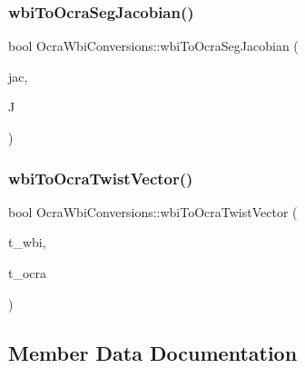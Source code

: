 \subsubsection{\texorpdfstring{wbi\+To\+Ocra\+Seg\+Jacobian()}{wbiToOcraSegJacobian()}}
{\footnotesize\ttfamily bool Ocra\+Wbi\+Conversions\+::wbi\+To\+Ocra\+Seg\+Jacobian (\begin{DoxyParamCaption}\item[{const Eigen\+::\+Matrix\+Xd \&}]{jac,  }\item[{Eigen\+::\+Matrix\+Xd \&}]{J }\end{DoxyParamCaption})\hspace{0.3cm}{\ttfamily [static]}}

\hypertarget{classocra__icub_1_1OcraWbiConversions_a37c2aea3bf156928cb90a16655c24cc9}{}\label{classocra__icub_1_1OcraWbiConversions_a37c2aea3bf156928cb90a16655c24cc9} 
\subsubsection{\texorpdfstring{wbi\+To\+Ocra\+Twist\+Vector()}{wbiToOcraTwistVector()}}
{\footnotesize\ttfamily bool Ocra\+Wbi\+Conversions\+::wbi\+To\+Ocra\+Twist\+Vector (\begin{DoxyParamCaption}\item[{Eigen\+::\+Twistd \&}]{t\+\_\+wbi,  }\item[{Eigen\+::\+Twistd \&}]{t\+\_\+ocra }\end{DoxyParamCaption})\hspace{0.3cm}{\ttfamily [static]}}



\subsection{Member Data Documentation}
\hypertarget{classocra__icub_1_1OcraWbiConversions_a05e66392df58e9dda2d4db590bdd65a0}{}\label{classocra__icub_1_1OcraWbiConversions_a05e66392df58e9dda2d4db590bdd65a0} 
